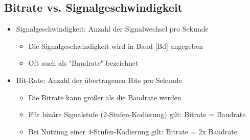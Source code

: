 \documentclass{scrreprt}
\begin{document}
\subsection*{Bitrate vs. Signalgeschwindigkeit}
\begin{itemize}
	\item Signalgeschwindigkeit: Anzahl der Signalwechsel pro Sekunde
	      \begin{itemize}
		      \item Die Signalgeschwindigkeit wird in Baud [Bd] angegeben
		      \item Oft auch als "Baudrate" bezeichnet
	      \end{itemize}
	\item Bit-Rate: Anzahl der übertragenen Bits pro Sekunde
	      \begin{itemize}
		      \item Die Bitrate kann größer als die Baudrate werden
		      \item Für binäre Signalstufe (2-Stufen-Kodierung) gilt: Bitrate = Baudrate
		      \item Bei Nutzung einer 4-Stufen-Kodierung gilt: Bitrate = 2x Baudrate
	      \end{itemize}
\end{itemize}
\end{document}
